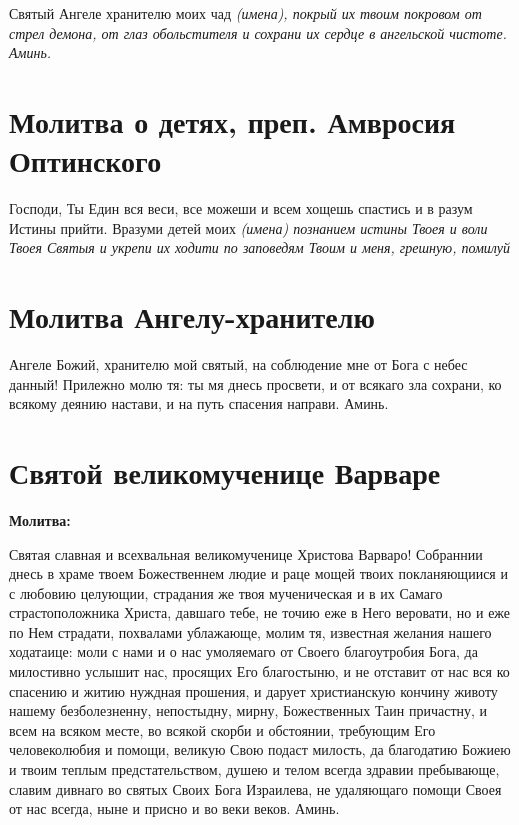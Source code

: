 Святый Ангеле хранителю моих чад \itshape (имена)\normalfont{}, покрый их твоим покровом от стрел демона, от глаз обольстителя и сохрани их сердце в ангельской чистоте. Аминь. 





\section{Молитва о детях, преп. Амвросия Оптинского}
 


Господи, Ты Един вся веси, все можеши и всем хощешь спастись и в разум Истины прийти. Вразуми детей моих \itshape (имена)\normalfont{} познанием истины Твоея и воли Твоея Святыя и укрепи их ходити по заповедям Твоим и меня, грешную, помилуй


\section{Молитва Ангелу-хранителю}
 


Ангеле Божий, хранителю мой святый, на соблюдение мне от Бога с небес данный! Прилежно молю тя: ты мя днесь просвети, и от всякаго зла сохрани, ко всякому деянию настави, и на путь спасения направи. Аминь.


\section{Святой великомученице Варваре}
 
\bfseries Молитва:\normalfont{}


Святая славная и всехвальная великомученице Христова Варваро! Собраннии днесь в храме твоем Божественнем людие и раце мощей твоих покланяющиися и с любовию целующии, страдания же твоя мученическая и в их Самаго страстоположника Христа, давшаго тебе, не точию еже в Него веровати, но и еже по Нем страдати, похвалами ублажающе, молим тя, известная желания нашего ходатаице: моли с нами и о нас умоляемаго от Своего благоутробия Бога, да милостивно услышит нас, просящих Его благостыню, и не отставит от нас вся ко спасению и житию нуждная прошения, и дарует христианскую кончину животу нашему безболезненну, непостыдну, мирну, Божественных Таин причастну, и всем на всяком месте, во всякой скорби и обстоянии, требующим Его человеколюбия и помощи, великую Свою подаст милость, да благодатию Божиею и твоим теплым предстательством, душею и телом всегда здравии пребывающе, славим дивнаго во святых Своих Бога Израилева, не удаляющаго помощи Своея от нас всегда, ныне и присно и во веки веков. Аминь.\mychapterending

